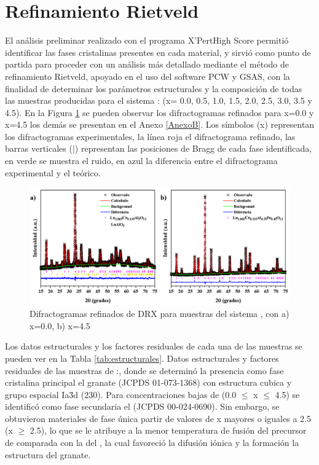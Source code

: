 \section{Refinamiento Rietveld}

El análisis preliminar realizado con el programa X'Pert\textregistered High
Score permitió
identificar las fases cristalinas presentes en cada material, y sirvió como
punto de partida para proceder con un análisis más detallado mediante el método
de refinamiento Rietveld, apoyado en el uso del software PCW y GSAS, con la
finalidad de determinar los parámetros estructurales y la composición de todas
las muestras producidas para el sistema :
(x= 0.0, 0.5, 1.0, 1.5, 2.0, 2.5, 3.0, 3.5 y 4.5). En la Figura \ref{fig:refi}
se pueden observar los difractogramas refinados para x=0.0 y x=4.5 los demás se
presentan en el Anexo \ref{AnexoB}. Los símbolos (x) representan los difractogramas 
experimentales, la línea roja el difractograma refinado, las barras verticales ($\mid$)
representan las posiciones de Bragg de cada fase identificada, en verde se
muestra el ruido, en azul la diferencia entre el difractograma experimental y el
teórico.\\

\begin{figure}[h]
    \centering%

    \includegraphics[width=\textwidth]{Kap3/Refinamiento.png}%
    \caption{Difractogramas refinados de DRX para muestras del sistema
    , con a) x=0.0, b) x=4.5} \label{fig:refi}
\end{figure}

Los datos estructurales y los factores residuales de cada una de las muestras
se pueden ver en la Tabla \ref{tab:estructurales}. Datos estructurales y factores residuales de las
muestras de :, donde se determinó la
presencia como fase cristalina principal el granate  (JCPDS
01-073-1368) con estructura cubica y grupo espacial Ia\={3}d (230). Para
concentraciones bajas de  (0.0 $\leq$ x $\leq$ 4.5) se identificó
como
fase secundaria el  (JCPDS 00-024-0690). Sin embargo, se obtuvieron
materiales de fase única partir de valores de x mayores o iguales a 2.5 (x
$\geq$ 2.5), lo que se le atribuye a la menor temperatura de fusión del
precursor de  comparada con la del , la cual favoreció
la difusión iónica y la formación la estructura del granate.\\

